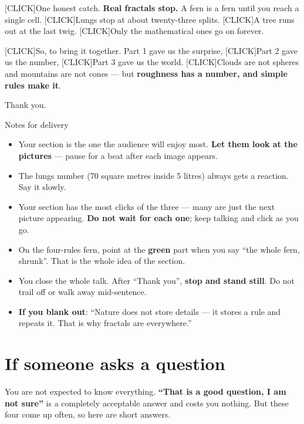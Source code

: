 \documentclass[12pt,a4paper]{article}
\newcommand{\cue}{\textcolor{RayColor}{\textsf{\footnotesize[CLICK]}}\hspace{0.3em}}
\newcommand{\stress}[1]{\textbf{#1}}
\begin{document}
\cue One honest catch. \stress{Real fractals stop.} A fern is a fern until you
reach a single cell. \cue Lungs stop at about twenty-three splits. \cue A tree
runs out at the last twig. \cue Only the mathematical ones go on forever.

\cue So, to bring it together. Part 1 gave us the surprise, \cue Part 2 gave us
the number, \cue Part 3 gave us the world. \cue Clouds are not spheres and
mountains are not cones --- but \stress{roughness has a number, and simple rules
make it}.

Thank you.

\begin{notebox}{Notes for delivery}
  \begin{itemize}[leftmargin=1.2em, itemsep=2pt, topsep=2pt]
    \item Your section is the one the audience will enjoy most. \stress{Let them
      look at the pictures} --- pause for a beat after each image appears.
    \item The lungs number (70 square metres inside 5 litres) always gets a
      reaction. Say it slowly.
    \item Your section has the most clicks of the three --- many are just the next
      picture appearing. \stress{Do not wait for each one}; keep talking and click
      as you go.
    \item On the four-rules fern, point at the \stress{green} part when you say
      ``the whole fern, shrunk''. That is the whole idea of the section.
    \item You close the whole talk. After ``Thank you'', \stress{stop and stand
      still}. Do not trail off or walk away mid-sentence.
    \item \stress{If you blank out}: ``Nature does not store details --- it stores
      a rule and repeats it. That is why fractals are everywhere.''
  \end{itemize}
\end{notebox}

\newpage
\section*{If someone asks a question}

You are not expected to know everything. \stress{``That is a good question, I am
not sure''} is a completely acceptable answer and costs you nothing. But these
four come up often, so here are short answers.
\end{document}
